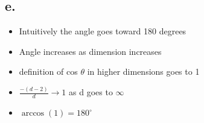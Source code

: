 \documentclass[11pt]{article}
\begin{document}
\subsection*{e.}
\label{sec:orgd15e7c2}
\begin{itemize}
\item Intuitively the angle goes toward 180 degrees
\item Angle increases as dimension increases
\item definition of cos \(\theta\) in higher dimensions goes to 1
\item \(\frac{-(d-2)}{d} \rightarrow 1\) as d goes to \(\infty\)
\item \(\arccos(1) = 180^\circ\)
\end{itemize}
\end{document}
